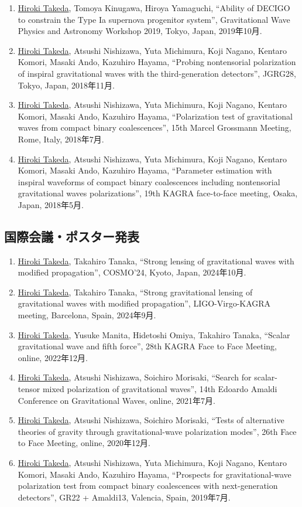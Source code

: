 \documentclass[uplatex, 11pt]{jsarticle}
\begin{document}
\begin{enumerate}
\item \uline{Hiroki Takeda}, Tomoya Kinugawa, Hiroya Yamaguchi, “Ability of DECIGO to constrain the Type Ia supernova progenitor system”, Gravitational Wave Physics and Astronomy Workshop 2019, Tokyo, Japan, 2019年10月.
\item \uline{Hiroki Takeda}, Atsushi Nishizawa, Yuta Michimura, Koji Nagano, Kentaro Komori, Masaki Ando, Kazuhiro Hayama, “Probing nontensorial polarization of inspiral gravitational waves with the third-generation detectors”, JGRG28, Tokyo, Japan, 2018年11月.
\item \uline{Hiroki Takeda}, Atsushi Nishizawa, Yuta Michimura, Koji Nagano, Kentaro Komori, Masaki Ando, Kazuhiro Hayama, “Polarization test of gravitational waves from compact binary coalescences”, 15th Marcel Grossmann Meeting, Rome, Italy, 2018年7月.
\item \uline{Hiroki Takeda}, Atsushi Nishizawa, Yuta Michimura, Koji Nagano, Kentaro Komori, Masaki Ando, Kazuhiro Hayama, “Parameter estimation with inspiral waveforms of compact binary coalescences including nontensorial gravitational waves polarizations”, 19th KAGRA face-to-face meeting, Osaka, Japan, 2018年5月.
\end{enumerate}
\subsection*{国際会議・ポスター発表}
\begin{enumerate}
\item \uline{Hiroki Takeda}, Takahiro Tanaka, “Strong lensing of gravitational waves with modified propagation”, COSMO'24, Kyoto, Japan, 2024年10月.
\item \uline{Hiroki Takeda}, Takahiro Tanaka, “Strong gravitational lensing of gravitational waves with modified propagation”, LIGO-Virgo-KAGRA meeting, Barcelona, Spain, 2024年9月.
\item \uline{Hiroki Takeda}, Yusuke Manita, Hidetoshi Omiya, Takahiro Tanaka, “Scalar gravitational wave and fifth force”, 28th KAGRA Face to Face Meeting, online, 2022年12月.
\item \uline{Hiroki Takeda}, Atsushi Nishizawa, Soichiro Morisaki, “Search for scalar-tensor mixed polarization of gravitational waves”, 14th Edoardo Amaldi Conference on Gravitational Waves, online, 2021年7月.
\item \uline{Hiroki Takeda}, Atsushi Nishizawa, Soichiro Morisaki, “Tests of alternative theories of gravity through gravitational-wave polarization modes”, 26th Face to Face Meeting, online, 2020年12月.
\item \uline{Hiroki Takeda}, Atsushi Nishizawa, Yuta Michimura, Koji Nagano, Kentaro Komori, Masaki Ando, Kazuhiro Hayama, “Prospects for gravitational-wave polarization test from compact binary coalescences with next-generation detectors”, GR22 + Amaldi13, Valencia, Spain, 2019年7月.
\end{enumerate}
\end{document}
